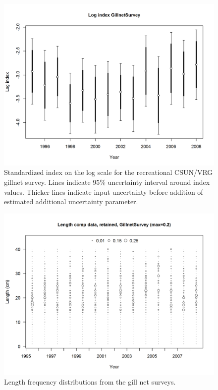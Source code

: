 \documentclass[12pt,]{article}
\begin{document}
\begin{figure}[htbp]
\centering
\includegraphics{r4ss/plots_mod1/index4_logcpuedata_GillnetSurvey.png}
\caption{Standardized index on the log scale for the recreational
CSUN/VRG gillnet survey. Lines indicate 95\% uncertainty interval around
index values. Thicker lines indicate input uncertainty before addition
of estimated additional uncertainty parameter.
\label{fig:index4_logcpuedata_GillnetSurvey}}
\end{figure}

\begin{figure}[htbp]
\centering
\includegraphics{r4ss/plots_mod1/comp_lendat_bubflt9mkt2.png}
\caption{Length frequency distributions from the gill net surveys.
\label{fig:Fleet9_GillnetSurvey_lendat_bubflt10mkt2}}
\end{figure}
\end{document}
